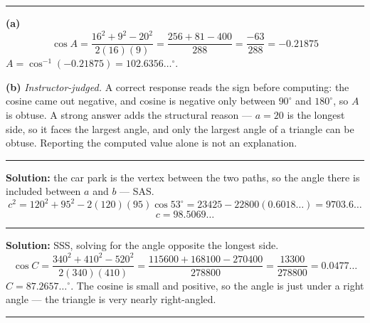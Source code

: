 \documentclass[12pt]{article}
\begin{document}
\vspace{0.1cm}\noindent\rule{\linewidth}{0.2pt}\vspace{0.1cm}


\textbf{(a)} \[ \cos A = \frac{16^2 + 9^2 - 20^2}{2(16)(9)} = \frac{256 + 81 - 400}{288} = \frac{-63}{288} = -0.21875 \]
$A = \cos^{-1}(-0.21875) = 102.6356\ldots^\circ$. 

\textbf{(b)} \emph{Instructor-judged.} A correct response reads the sign before computing: the cosine came out negative, and cosine is negative only between $90^\circ$ and $180^\circ$, so $A$ is obtuse. A strong answer adds the structural reason --- $a = 20$ is the longest side, so it faces the largest angle, and only the largest angle of a triangle can be obtuse. Reporting the computed value alone is not an explanation.

\vspace{0.1cm}\noindent\rule{\linewidth}{0.2pt}\vspace{0.1cm}


\textbf{Solution:} the car park is the vertex between the two paths, so the angle there is included between $a$ and $b$ --- SAS.
\[ c^2 = 120^2 + 95^2 - 2(120)(95)\cos 53^\circ = 23425 - 22800(0.6018\ldots) = 9703.6\ldots \]
\[ c = 98.5069\ldots \]

\vspace{0.1cm}\noindent\rule{\linewidth}{0.2pt}\vspace{0.1cm}


\textbf{Solution:} SSS, solving for the angle opposite the longest side.
\[ \cos C = \frac{340^2 + 410^2 - 520^2}{2(340)(410)} = \frac{115600 + 168100 - 270400}{278800} = \frac{13300}{278800} = 0.0477\ldots \]
$C = 87.2657\ldots^\circ$. The cosine is small and positive, so the angle is just under a right angle --- the triangle is very nearly right-angled. 

\vspace{0.1cm}\noindent\rule{\linewidth}{0.2pt}\vspace{0.1cm}

\end{document}

